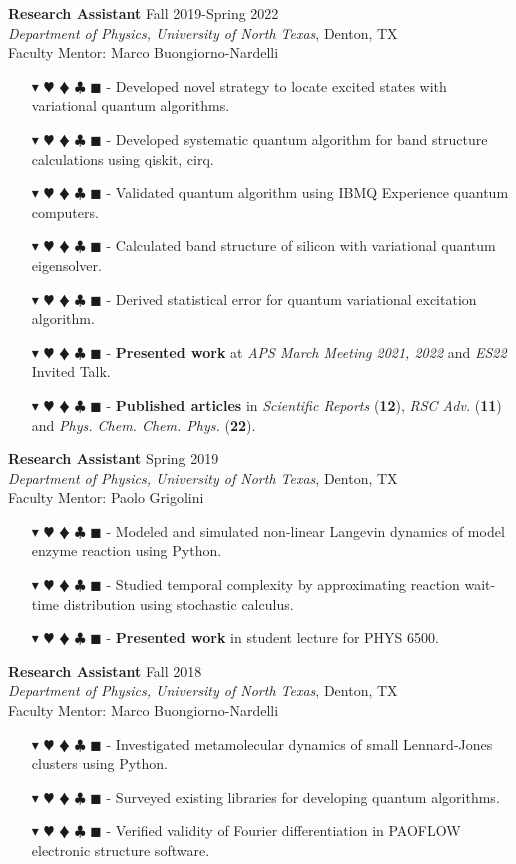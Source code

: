 \documentclass[overlapped, 10pt]{res} %
\newcommand{\physics}{$\blacktriangledown$}
\newcommand{\biochem}{$\varheartsuit$}
\newcommand{\shannon}{$\vardiamondsuit$}
\newcommand{\classic}{$\clubsuit$}
\newcommand{\quantum}{$\blacksquare$}
\newcommand{\physicscolor}{\color{YellowOrange}}
\newcommand{\biochemcolor}{\color{Emerald}}
\newcommand{\shannoncolor}{\color{Goldenrod}}
\newcommand{\classiccolor}{\color{Cyan}}
\newcommand{\quantumcolor}{\color{RedOrange}}
\newcommand{\tag}[1]{
    {\IfSubStr{#1}{\physics}{\physicscolor}{\color{White}}\physics}
    {\IfSubStr{#1}{\biochem}{\biochemcolor}{\color{White}}\biochem}
    {\IfSubStr{#1}{\shannon}{\shannoncolor}{\color{White}}\shannon}
    {\IfSubStr{#1}{\classic}{\classiccolor}{\color{White}}\classic}
    {\IfSubStr{#1}{\quantum}{\quantumcolor}{\color{White}}\quantum}
}
\begin{document}
\begin{resume}
\textbf{Research Assistant} \hfill Fall 2019-Spring 2022 \\
\textit{Department of Physics, University of North Texas}, Denton, TX \\
Faculty Mentor: Marco Buongiorno-Nardelli
\begin{itemize} \itemsep -2pt %
\item[\tag{\physics\quantum}-] Developed novel strategy to locate excited states with variational quantum algorithms.
\item[\tag{\physics\quantum}-] Developed systematic quantum algorithm for band structure calculations using qiskit, cirq.
\item[\tag{\physics\quantum}-] Validated quantum algorithm using IBMQ Experience quantum computers.
\item[\tag{\physics\quantum}-] Calculated band structure of silicon with variational quantum eigensolver.
\item[\tag{\physics\quantum}-] Derived statistical error for quantum variational excitation algorithm.
\item[\tag{}-] \textbf{Presented work} at \textit{APS March Meeting 2021, 2022} and \textit{ES22} Invited Talk.
\item[\tag{}-] \textbf{Published articles} in \textit{Scientific Reports} (\textbf{12}), \textit{RSC Adv.} (\textbf{11}) and \textit{Phys. Chem. Chem. Phys.} (\textbf{22}).
\end{itemize}

\textbf{Research Assistant} \hfill Spring 2019 \\
\textit{Department of Physics, University of North Texas}, Denton, TX \\
Faculty Mentor: Paolo Grigolini
\begin{itemize} \itemsep -2pt %
\item[\tag{\biochem\classic}-] Modeled and simulated non-linear Langevin dynamics of model enzyme reaction using Python.
\item[\tag{\biochem}-] Studied temporal complexity by approximating reaction wait-time distribution using stochastic calculus.
\item[\tag{}-] \textbf{Presented work} in student lecture for PHYS 6500.
\end{itemize}

\textbf{Research Assistant} \hfill Fall 2018 \\
\textit{Department of Physics, University of North Texas}, Denton, TX \\
Faculty Mentor: Marco Buongiorno-Nardelli
\begin{itemize} \itemsep -2pt %
\item[\tag{\physics\classic}-] Investigated metamolecular dynamics of small Lennard-Jones clusters using Python.
\item[\tag{\quantum}-] Surveyed existing libraries for developing quantum algorithms.
\item[\tag{\physics\classic}-] Verified validity of Fourier differentiation in PAOFLOW electronic structure software.
\end{itemize}


\end{resume}
\end{document}
